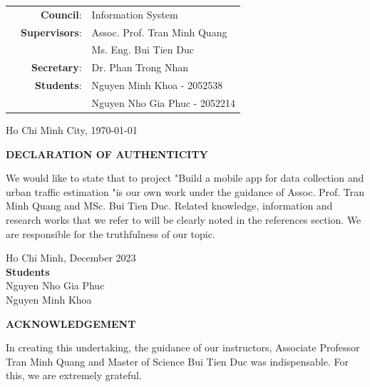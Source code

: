 \documentclass[a4paper]{article}
\begin{document}
\begin{titlepage}
\begin{center}
\begin{table}[h]
    \large
    \begin{tabular}{r r l}
    \hspace{4 cm} & \textbf{Council}: & Information System \\
    & \textbf{Supervisors}: & Assoc. Prof. Tran Minh Quang \\ 
    & & Ms. Eng. Bui Tien Duc\\
    & \textbf{Secretary}: & Dr. Phan Trong Nhan \\
    & \textbf{Students}: & Nguyen Minh Khoa - 2052538\\
    & & Nguyen Nho Gia Phuc - 2052214 \\
    \end{tabular}
\end{table}
\vspace{2cm}

{Ho Chi Minh City, \today}
\end{center}
\end{titlepage}

\begin{center}
    \Large{\textbf{DECLARATION OF AUTHENTICITY}}
\end{center}
We would like to state that to project "Build a mobile app for data collection and urban traffic estimation "is our own work under the guidance of Assoc. Prof. Tran Minh Quang and MSc. Bui Tien Duc. Related knowledge, information and research works that we refer to will be clearly noted in the references section.
We are responsible for the truthfulness of our topic.

\begin{flushright}
    Ho Chi Minh, December 2023 \\
    \textbf{Students} \\
    Nguyen Nho Gia Phuc \\
    Nguyen Minh Khoa
\end{flushright}


\newpage
\begin{center}
    \Large{\textbf{ACKNOWLEDGEMENT}}
\end{center}

In creating this undertaking, the guidance of our instructors, Associate Professor Tran Minh Quang and Master of Science Bui Tien Duc was indispensable. For this, we are extremely grateful. 
\end{document}

